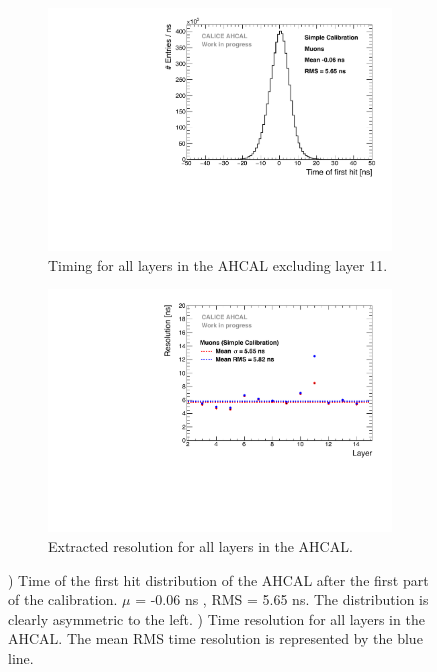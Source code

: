 \begin{figure}[htbp!]
	\begin{subfigure}[t]{0.5\textwidth}
		\centering
		\includegraphics[width=1\textwidth]{chap5/fig_AHCAL_timing/Muons/Timing_AHCAL_noCorrections.pdf}
		\caption{Timing for all layers in the AHCAL excluding layer 11.}\label{fig:timing_nocorrection}
	\end{subfigure}
	\hfill
	\begin{subfigure}[t]{0.5\textwidth}
		\centering
		\includegraphics[width=1\textwidth]{chap5/fig_AHCAL_timing/Muons/ResolutionPerModule_noCorrections.pdf}
		\caption{Extracted resolution for all layers in the AHCAL.}\label{fig:reso_nocorrection}
	\end{subfigure}
	\caption{) Time of the first hit distribution of the AHCAL after the first part of the calibration. $\mu$ = -0.06 ns , RMS = 5.65 ns. The distribution is clearly asymmetric to the left. ) Time resolution for all layers in the AHCAL. The mean RMS time resolution is represented by the blue line.}
\end{figure}

